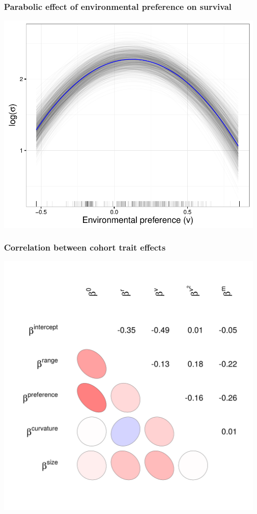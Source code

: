 \documentclass{beamer}
\begin{document}
\begin{frame}
  \frametitle{Parabolic effect of environmental preference on survival}
  \begin{center}
    \includegraphics[width=\textwidth,height=0.8\textheight,keepaspectratio=true]{figure/env_effect}
  \end{center}
\end{frame}

\begin{frame}
  \frametitle{Correlation between cohort trait effects}
  \begin{center}
    \includegraphics[width=\textwidth,height=0.8\textheight,keepaspectratio=true]{figure/wei_cor_heatmap}
  \end{center}
\end{frame}
\end{document}
